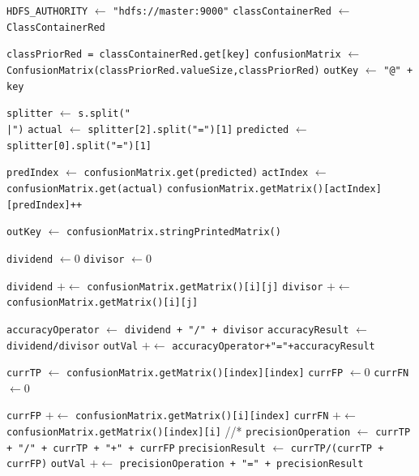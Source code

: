 \begin{enumerate}
\begin{itemize}
\begin{enumerate}
\begin{algorithm}[H]
\begin{algorithmic}[1]
			\State \verb|HDFS_AUTHORITY| $\gets$ \texttt{"hdfs://master:9000"}
			\State \texttt{classContainerRed} $\gets$ \texttt{ClassContainerRed}

			\State \texttt{classPriorRed = classContainerRed.get[key]}
			\State \texttt{confusionMatrix} $\gets$ \texttt{ConfusionMatrix(classPriorRed.valueSize,classPriorRed)}
			\State \texttt{outKey} $\gets$ \texttt{"@" + key}
			
				\State \texttt{splitter} $\gets$ \texttt{s.split("\\|")}
				\State \texttt{actual} $\gets$ \texttt{splitter[2].split("=")[1]}
				\State \texttt{predicted} $\gets$ \texttt{splitter[0].split("=")[1]}
				
				\State \texttt{predIndex} $\gets$ \texttt{confusionMatrix.get(predicted)}
				\State \texttt{actIndex} $\gets$ \texttt{confusionMatrix.get(actual)}
				\State \texttt{confusionMatrix.getMatrix()[actIndex][predIndex]++}
			\EndFor 
        	
        	\State \texttt{outKey} $\gets$ \texttt{confusionMatrix.stringPrintedMatrix()}
			   	
        	\State \texttt{dividend} $\gets 0$ 
			\State \texttt{divisor}	$\gets 0$
			
						\State \texttt{dividend} $+\gets$ \texttt{confusionMatrix.getMatrix()[i][j]}
					\EndIf
					\State \texttt{divisor} $+\gets$ \texttt{confusionMatrix.getMatrix()[i][j]}
				\EndFor
			\EndFor
			
			\State \texttt{accuracyOperator} $\gets$ \texttt{dividend + "/" + divisor}
			\State \texttt{accuracyResult} $\gets$ \texttt{dividend/divisor}
			\State \texttt{outVal} $+\gets$ \texttt{accuracyOperator+"="+accuracyResult}
			

				\State \texttt{currTP} $\gets$ \texttt{confusionMatrix.getMatrix()[index][index]}
				\State \texttt{currFP} $\gets 0$
				\State \texttt{currFN} $\gets 0$
				
						\State \texttt{currFP} $+\gets$ \texttt{confusionMatrix.getMatrix()[i][index]}
						\State \texttt{currFN} $+\gets$ \texttt{confusionMatrix.getMatrix()[index][i]}
					\EndIf
				\EndFor
				//*
				\State \texttt{precisionOperation} $\gets$ \texttt{currTP + "/" + currTP + "+" + currFP}
				\State \texttt{precisionResult} $\gets$ \texttt{currTP/(currTP + currFP)}
				\State \texttt{outVal} $+\gets$ \texttt{precisionOperation + "=" + precisionResult}
				

\end{algorithmic}
\end{algorithm}
\end{enumerate}
\end{itemize}
\end{enumerate}
